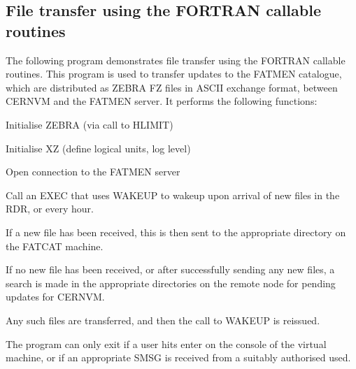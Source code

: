 \subsection{File transfer using the FORTRAN callable routines}
\par
The following program demonstrates file transfer using the
FORTRAN callable routines. This program is used to transfer
updates to the FATMEN catalogue, which are distributed
as ZEBRA FZ files in ASCII exchange format, between CERNVM
and the FATMEN server.
It performs the following functions:
\begin{OL}
\item
Initialise ZEBRA (via call to HLIMIT)
\item
Initialise XZ    (define logical units, log level)
\item
Open connection to the FATMEN server
\item
Call an EXEC that uses WAKEUP to wakeup upon arrival of new files
in the RDR, or every hour.
\item
If a new file has been received, this is then sent to the
appropriate directory on the FATCAT machine.
\item
If no new file has been received, or after successfully sending
any new files, a search is made in the appropriate directories
on the remote node for pending updates for CERNVM.
\item
Any such files are transferred, and then the call to WAKEUP is reissued.
\item
The program can only exit if a user hits enter on the console
of the virtual machine, or if an appropriate SMSG is received
from a suitably authorised used.
\end{OL}
